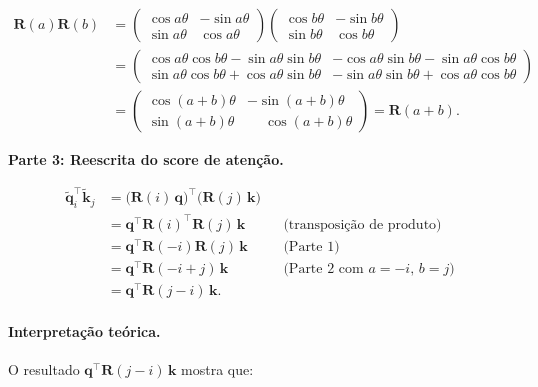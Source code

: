 \documentclass{dlproblemset}
\begin{document}
\begin{align*}
  \mathbf{R}(a) \mathbf{R}(b)
  &= \begin{pmatrix}\cos a\theta & -\sin a\theta \\ \sin a\theta & \cos a\theta\end{pmatrix}
     \begin{pmatrix}\cos b\theta & -\sin b\theta \\ \sin b\theta & \cos b\theta\end{pmatrix} \\
  &= \begin{pmatrix}
       \cos a\theta\cos b\theta - \sin a\theta\sin b\theta
         & -\cos a\theta\sin b\theta - \sin a\theta\cos b\theta \\
       \sin a\theta\cos b\theta + \cos a\theta\sin b\theta
         & -\sin a\theta\sin b\theta + \cos a\theta\cos b\theta
     \end{pmatrix} \\
  &= \begin{pmatrix}
       \cos(a+b)\theta & -\sin(a+b)\theta \\
       \sin(a+b)\theta & \phantom{-}\cos(a+b)\theta
     \end{pmatrix}
  = \mathbf{R}(a+b).
\end{align*}

\textbf{Parte 3: Reescrita do score de atenção.}

\begin{align*}
  \tilde{\mathbf{q}}_i^\top \tilde{\mathbf{k}}_j
  &= \bigl(\mathbf{R}(i)\,\mathbf{q}\bigr)^\top \bigl(\mathbf{R}(j)\,\mathbf{k}\bigr) \\
  &= \mathbf{q}^\top \mathbf{R}(i)^\top \mathbf{R}(j)\,\mathbf{k} & &\text{(transposição de produto)} \\
  &= \mathbf{q}^\top \mathbf{R}(-i) \mathbf{R}(j)\,\mathbf{k} & &\text{(Parte 1)} \\
  &= \mathbf{q}^\top \mathbf{R}(-i + j)\,\mathbf{k} & &\text{(Parte 2 com } a = -i,\, b = j\text{)} \\
  &= \mathbf{q}^\top \mathbf{R}(j - i)\,\mathbf{k}. & &
\end{align*}

\paragraph{Interpretação teórica.}

O resultado $\mathbf{q}^\top \mathbf{R}(j-i)\,\mathbf{k}$ mostra que:
\end{document}
